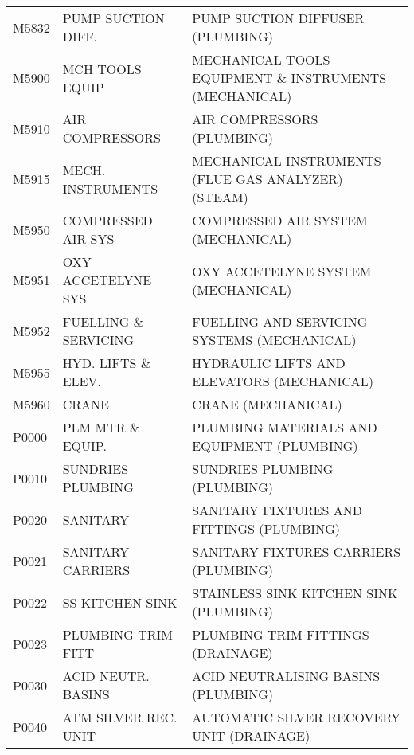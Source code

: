 \begin{longtable}[l]{l%
                  l|%
                  l|}
\rowcolor{thetableheadbgcolor!0.25!white} M5832       & PUMP SUCTION DIFF.   & PUMP SUCTION DIFFUSER (PLUMBING)   \\
\rowcolor{thetableheadbgcolor!0.25!white} M5900       & MCH TOOLS EQUIP   & MECHANICAL TOOLS EQUIPMENT \& INSTRUMENTS (MECHANICAL)   \\
\rowcolor{thetableheadbgcolor!0.25!white} M5910       & AIR COMPRESSORS   & AIR COMPRESSORS (PLUMBING)   \\
\rowcolor{thetableheadbgcolor!0.25!white} M5915       & MECH. INSTRUMENTS   & MECHANICAL INSTRUMENTS (FLUE GAS ANALYZER) (STEAM)   \\
\rowcolor{thetableheadbgcolor!0.25!white} M5950       & COMPRESSED AIR SYS   & COMPRESSED AIR SYSTEM (MECHANICAL)   \\
\rowcolor{thetableheadbgcolor!0.25!white} M5951       & OXY ACCETELYNE SYS   & OXY ACCETELYNE SYSTEM (MECHANICAL)   \\
\rowcolor{thetableheadbgcolor!0.25!white} M5952       & FUELLING \& SERVICING   & FUELLING AND SERVICING SYSTEMS (MECHANICAL)   \\
\rowcolor{thetableheadbgcolor!0.25!white} M5955       & HYD. LIFTS \& ELEV.   & HYDRAULIC LIFTS AND ELEVATORS (MECHANICAL)   \\
\rowcolor{thetableheadbgcolor!0.25!white} M5960       & CRANE   & CRANE (MECHANICAL)   \\
\rowcolor{thetableheadbgcolor!0.25!white} P0000       & PLM MTR \& EQUIP.   & PLUMBING MATERIALS AND EQUIPMENT (PLUMBING)   \\
\rowcolor{thetableheadbgcolor!0.25!white} P0010       & SUNDRIES PLUMBING   & SUNDRIES PLUMBING (PLUMBING)   \\
\rowcolor{thetableheadbgcolor!0.25!white} P0020       & SANITARY   & SANITARY FIXTURES AND FITTINGS (PLUMBING)   \\
\rowcolor{thetableheadbgcolor!0.25!white} P0021       & SANITARY CARRIERS   & SANITARY FIXTURES CARRIERS (PLUMBING)   \\
\rowcolor{thetableheadbgcolor!0.25!white} P0022       & SS KITCHEN SINK   & STAINLESS SINK KITCHEN SINK (PLUMBING)   \\
\rowcolor{thetableheadbgcolor!0.25!white} P0023       & PLUMBING TRIM FITT   & PLUMBING TRIM FITTINGS (DRAINAGE)   \\
\rowcolor{thetableheadbgcolor!0.25!white} P0030       & ACID NEUTR. BASINS   & ACID NEUTRALISING BASINS (PLUMBING)   \\
\rowcolor{thetableheadbgcolor!0.25!white} P0040       & ATM SILVER REC. UNIT   & AUTOMATIC SILVER RECOVERY UNIT (DRAINAGE)   \\

\end{longtable}
